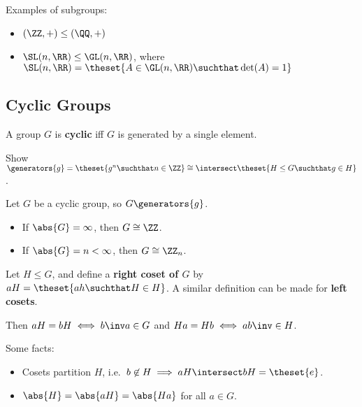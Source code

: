 Examples of subgroups:

\begin{itemize}
\tightlist
\item
  \((\ZZ, +) \leq (\QQ, +)\)
\item
  \(\SL(n, \RR) \leq \GL(n, \RR)\), where
  \(\SL(n, \RR) = \theset{A\in \GL(n, \RR) \suchthat \det(A) = 1}\)
\end{itemize}

\hypertarget{cyclic-groups}{%
\subsection{Cyclic Groups}\label{cyclic-groups}}


A group \(G\) is \textbf{cyclic} iff \(G\) is generated by a single
element. 


Show
\(\generators{g} = \theset{g^n \suchthat n\in\ZZ} \cong \intersect \theset{H \leq G \suchthat g \in H}\).


Let \(G\) be a cyclic group, so \(G \generators{g}\).

\begin{itemize}
\tightlist
\item
  If \(\abs{G} = \infty\), then \(G \cong \ZZ\).
\item
  If \(\abs{G} = n < \infty\), then \(G \cong \ZZ_n\).
\end{itemize}



Let \(H \leq G\), and define a \textbf{right coset of \(G\)} by
\(aH = \theset{ah \suchthat H \in H}\). A similar definition can be made
for \textbf{left cosets}. 

Then \(aH = bH \iff b\inv a \in G\) and \(Ha = Hb \iff ab\inv \in H\).

Some facts:

\begin{itemize}
\tightlist
\item
  Cosets partition \(H\),
  i.e.~\(b\not\in H \implies aH \intersect bH = \theset{e}\).
\item
  \(\abs{H} = \abs{aH} = \abs{Ha}\) for all \(a\in G\).
\end{itemize}

